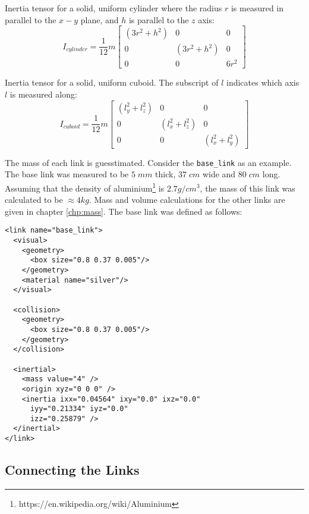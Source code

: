 Inertia tensor for a solid, uniform cylinder where the radius $r$ is measured in parallel to the $x - y$ plane, and $h$ is parallel to the $z$ axis:
\begin{equation}
I_{cylinder} = \frac{1}{12}m \begin{bmatrix}
	(3 r^2 + h^2) & 0 & 0 \\[0.3em]
	0 & (3 r^2 + h^2) & 0 \\[0.3em]
	0 & 0 & 6r^2
	\end{bmatrix}
	\label{eq:cylinder}
\end{equation}

Inertia tensor for a solid, uniform cuboid. The subscript of $l$ indicates which axis $l$ is measured along:
\begin{equation}
I_{cuboid} = \frac{1}{12}m \begin{bmatrix}
	(l_y^2 + l_z^2) & 0 & 0 \\[0.3em]
	0 & (l_x^2 + l_z^2) & 0 \\[0.3em]
	0 & 0 & (l_x^2 + l_y^2)
\end{bmatrix}
\label{eq:cuboid}
\end{equation}

The mass of each link is guesstimated. Consider the \texttt{base\_link} as an example. The base link was measured to be $5 \; mm$ thick, $37 \; cm$ wide and $80 \; cm$ long. Assuming that the density of aluminium\footnote{https://en.wikipedia.org/wiki/Aluminium} is $2.7 g/cm^3$, the mass of this link was calculated to be $\approx 4 kg$. Mass and volume calculations for the other links are given in chapter \ref{chp:mass}. The base link was defined as follows:

\lstset{language=XML}
\begin{lstlisting}
<link name="base_link">
  <visual>
    <geometry>
      <box size="0.8 0.37 0.005"/>
    </geometry>
    <material name="silver"/>
  </visual>
	  
  <collision>
    <geometry>
      <box size="0.8 0.37 0.005"/>
    </geometry>
  </collision>
	  
  <inertial>
    <mass value="4" />
    <origin xyz="0 0 0" />
    <inertia ixx="0.04564" ixy="0.0" ixz="0.0"
      iyy="0.21334" iyz="0.0" 
      izz="0.25879" />
  </inertial>
</link>
\end{lstlisting}



\subsection{Connecting the Links}

